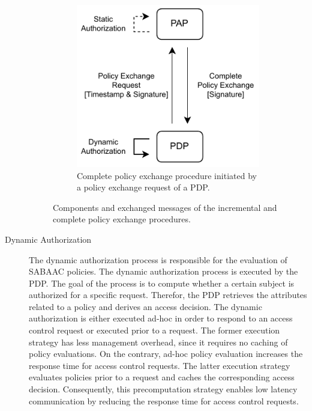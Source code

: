 \begin{description}
\begin{figure}
\begin{subfigure}[t]{0.48\linewidth}
            \includegraphics[width=\linewidth]{figures/SABAAC_protocols_authorization_dynamic_policyexchange_complete.drawio.pdf}
            \caption{Complete policy exchange procedure initiated by a policy exchange request of a PDP.}
            \label{fig:sabaac_authorization_dynamic_policyexchange_complete}
        \end{subfigure}
        \caption{Components and exchanged messages of the incremental and complete policy exchange procedures.
        }
        \label{fig:sabaac_authorization_dynamic_policyexchange}
    \end{figure}
    \item[Dynamic Authorization] The dynamic authorization process is responsible for the evaluation of SABAAC policies.
    The dynamic authorization process is executed by the PDP.
    The goal of the process is to compute whether a certain subject is authorized for a specific request.
    Therefor, the PDP retrieves the attributes related to a policy and derives an access decision.
    The dynamic authorization is either executed ad-hoc in order to respond to an access control request or executed prior to a request.
    The former execution strategy has less management overhead, since it requires no caching of policy evaluations.
    On the contrary, ad-hoc policy evaluation increases the response time for access control requests.
    The latter execution strategy evaluates policies prior to a request and caches the corresponding access decision.
    Consequently, this precomputation strategy enables low latency communication by reducing the response time for access control requests.
\end{description}

